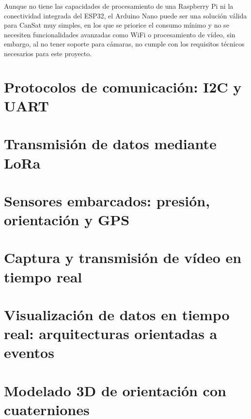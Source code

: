 \begin{itemize}
    Aunque no tiene las capacidades de procesamiento de una Raspberry Pi ni la conectividad integrada del ESP32, el Arduino Nano puede ser una solución válida para CanSat muy simples,
    en los que se priorice el consumo mínimo y no se necesiten funcionalidades avanzadas como WiFi o procesamiento de vídeo, sin embargo, al no tener soporte para cámaras,
    no cumple con los requisitos técnicos necesarios para este proyecto.

\end{itemize}


\section{Protocolos de comunicación: I2C y UART}


\section{Transmisión de datos mediante LoRa}


\section{Sensores embarcados: presión, orientación y GPS}


\section{Captura y transmisión de vídeo en tiempo real}


\section{Visualización de datos en tiempo real: arquitecturas orientadas a eventos}


\section{Modelado 3D de orientación con cuaterniones}